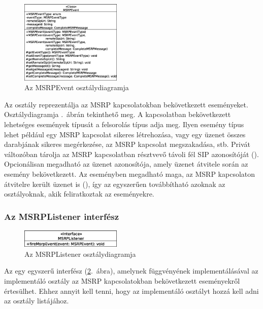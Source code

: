 \begin{figure}
  \vspace{-15pt}
  \begin{center}
    \includegraphics[width=0.43\textwidth]{img/class_diagrams/MSRPEvent.eps}
  \end{center}
  \vspace{-15pt}
  \captionsetup{font=scriptsize}
  \caption{Az MSRPEvent osztálydiagramja}
   \label{fig:class_event}
  \vspace{-10pt}
\end{figure}
Az  osztály reprezentálja az MSRP kapcsolatokban bekövetkezett eseményeket. Osztálydiagramja .~ábrán tekinthető meg. A kapcsolatban bekövetkezett lehetséges események típusát a  felsorolás típus adja meg. Ilyen esemény típus lehet például egy MSRP kapcsolat sikeres létrehozása, vagy egy üzenet összes darabjának sikeres megérkezése, az MSRP kapcsolat megszakadása, stb. Privát változóban tárolja az MSRP kapcsolatban résztvevő távoli fél SIP azonosítóját (). Opcionálisan megadható az üzenet azonosítója, amely üzenet átvitele során az esemény bekövetkezett. Az eseményben megadható maga, az MSRP kapcsolaton átvitelre került üzenet is (), így az egyszerűen továbbítható azoknak az osztályoknak, akik feliratkoztak az eseményekre.

\subsubsection*{Az MSRPListener interfész}
\label{sec:msrp_listener}

\begin{figure}
  \vspace{-15pt}
  \begin{center}
    \includegraphics[width=0.43\textwidth]{img/class_diagrams/MSRPListener.eps}
  \end{center}
  \vspace{-15pt}
  \captionsetup{font=scriptsize}
  \caption{Az MSRPListener osztálydiagramja}
   \label{fig:class_listener}
  \vspace{-10pt}
\end{figure}
Az  egy egyszerű interfész (\ref{fig:class_listener}.~ábra), amelynek  függvényének implementálásával az implementáló osztály az MSRP kapcsolatokban bekövetkezett eseményekről értesülhet. Ehhez annyit kell tenni, hogy az implementáló osztályt hozzá kell adni az  osztály  listájához.

